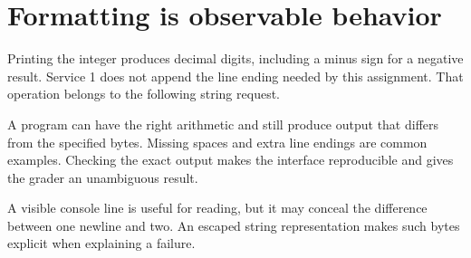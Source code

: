 \section{Formatting is observable
  behavior}\label{001-console-calculation-p16-formatting-is-observable-behavior}

Printing the integer produces decimal digits, including a minus sign for
a negative result. Service 1 does not append the line ending needed by
this assignment. That operation belongs to the following string request.

A program can have the right arithmetic and still produce output that
differs from the specified bytes. Missing spaces and extra line endings
are common examples. Checking the exact output makes the interface
reproducible and gives the grader an unambiguous result.

A visible console line is useful for reading, but it may conceal the
difference between one newline and two. An escaped string representation
makes such bytes explicit when explaining a failure.
